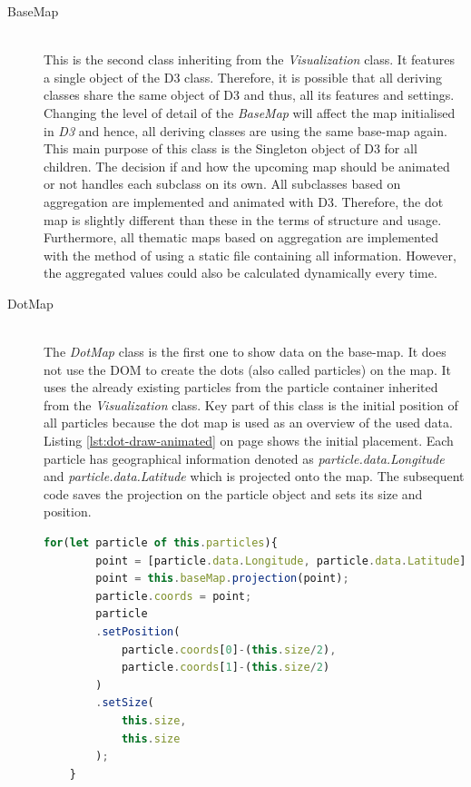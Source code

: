 \begin{description}
\item[BaseMap] \hfill \\
This is the second class inheriting from the \textit{Visualization} class. It features a single object of the \ac{D3} class. Therefore, it is possible that all deriving classes share the same object of \ac{D3} and thus, all its features and settings. Changing the level of detail of the \textit{BaseMap} will affect the map initialised in \textit{\ac{D3}} and hence, all deriving classes are using the same base-map again. This main purpose of this class is the Singleton object of \ac{D3} for all children.
The decision if and how the upcoming map should be animated or not handles each subclass on its own. All subclasses based on aggregation are implemented and animated with \ac{D3}. Therefore, the dot map is slightly different than these in the terms of structure and usage. Furthermore, all thematic maps based on aggregation are implemented with the method of using a static file containing all information. However, the aggregated values could also be calculated dynamically every time.

\item[DotMap] \hfill \\
The \textit{DotMap} class is the first one to show data on the base-map. It does not use the \ac{DOM} to create the dots (also called particles) on the map. It uses the already existing particles from the particle container inherited from the \textit{Visualization} class. Key part of this class is the initial position of all particles because the dot map is used as an overview of the used data. Listing \ref{lst:dot-draw-animated} on page \pageref{lst:dot-draw-animated} shows the initial placement. Each particle has geographical information denoted as \textit{particle.data.Longitude} and \textit{particle.data.Latitude} which is projected onto the map. The subsequent code saves the projection on the particle object and sets its size and position.

\begin{lstlisting}[language=JavaScript, caption={Particles on a dot map getting animated.}, label={lst:dot-draw-animated}]
    for(let particle of this.particles){
        point = [particle.data.Longitude, particle.data.Latitude];
        point = this.baseMap.projection(point);
        particle.coords = point;
        particle
        .setPosition(
            particle.coords[0]-(this.size/2),
            particle.coords[1]-(this.size/2)
        )
        .setSize(
            this.size,
            this.size
        );
    }


\end{lstlisting}
\end{description}
